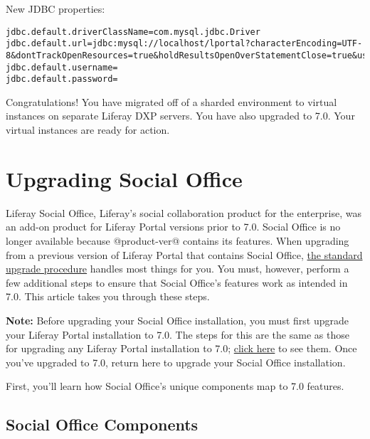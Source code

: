 \begin{enumerate}
  New JDBC properties:

\begin{verbatim}
jdbc.default.driverClassName=com.mysql.jdbc.Driver
jdbc.default.url=jdbc:mysql://localhost/lportal?characterEncoding=UTF-8&dontTrackOpenResources=true&holdResultsOpenOverStatementClose=true&useFastDateParsing=false&useUnicode=true
jdbc.default.username=
jdbc.default.password=
\end{verbatim}
\end{enumerate}

Congratulations! You have migrated off of a sharded environment to
virtual instances on separate Liferay DXP servers. You have also
upgraded to 7.0. Your virtual instances are ready for action.

\section{Upgrading Social Office}\label{upgrading-social-office}

Liferay Social Office, Liferay's social collaboration product for the
enterprise, was an add-on product for Liferay Portal versions prior to
7.0. Social Office is no longer available because @product-ver@ contains
its features. When upgrading from a previous version of Liferay Portal
that contains Social Office,
\href{/docs/7-0/deploy/-/knowledge_base/d/upgrading-to-liferay-7}{the
standard upgrade procedure} handles most things for you. You must,
however, perform a few additional steps to ensure that Social Office's
features work as intended in 7.0. This article takes you through these
steps.

\noindent\hrulefill

\textbf{Note:} Before upgrading your Social Office installation, you
must first upgrade your Liferay Portal installation to 7.0. The steps
for this are the same as those for upgrading any Liferay Portal
installation to 7.0;
\href{/docs/7-0/deploy/-/knowledge_base/d/upgrading-to-liferay-7}{click
here} to see them. Once you've upgraded to 7.0, return here to upgrade
your Social Office installation.

\noindent\hrulefill

First, you'll learn how Social Office's unique components map to 7.0
features.

\subsection{Social Office Components}\label{social-office-components}

